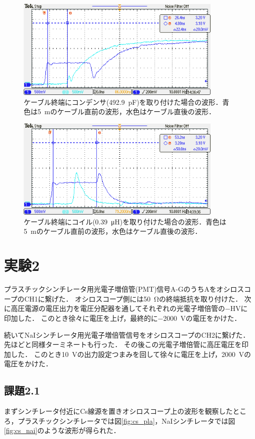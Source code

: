 \documentclass[a4paper,11pt]{jsarticle}
\begin{document}
\begin{figure}[htbp]
  \centering
  \includegraphics[width=10cm]{TEK00733.png}
  \caption{ケーブル終端にコンデンサ(\SI{492.9}{\pF})を取り付けた場合の波形．青色は\SI{5}{m}のケーブル直前の波形，水色はケーブル直後の波形．}
  \label{fig:C=493}
\end{figure}

\begin{figure}[htbp]
  \centering
  \includegraphics[width=10cm]{TEK00734.png}
  \caption{ケーブル終端にコイル(\SI{0.39}{\micro H})を取り付けた場合の波形．青色は\SI{5}{m}のケーブル直前の波形，水色はケーブル直後の波形．}
  \label{fig:L=0.39}
\end{figure}


\section{実験2}
プラスチックシンチレータ用光電子増倍管(PMT)信号A-GのうちAをオシロスコープのCH1に繋げた．
オシロスコープ側には\SI{50}{\ohm}の終端抵抗を取り付けた．
次に高圧電源の電圧出力を電圧分配器を通してそれぞれの光電子増倍管の$-$HVに印加した．
このとき徐々に電圧を上げ，最終的に\SI{-2000}{V}の電圧をかけた．

続いてNaIシンチレータ用光電子増倍管信号をオシロスコープのCH2に繋げた．
先ほどと同様ターミネートも行った．
その後この光電子増倍管に高圧電圧を印加した．
このとき\SI{10}{V}の出力設定つまみを回して徐々に電圧を上げ，\SI{+2000}{V}の電圧をかけた．

\subsection{課題2.1}
まずシンチレータ付近にCs線源を置きオシロスコープ上の波形を観察したところ，プラスチックシンチレータでは図\ref{fig:cs_pla}，NaIシンチレータでは図\ref{fig:cs_nai}のような波形が得られた．
\end{document}
